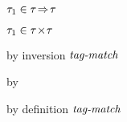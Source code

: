 {\begin{lamportproof*}
    \begin{pfproof}
      \qedstep
        \begin{pfproof}
          {$\tau_1 \in \tau\!\Rightarrow\!\tau$}
        \end{pfproof}
    \end{pfproof}

    \begin{pfproof}
      \qedstep
        \begin{pfproof}
          {$\tau_1 \in \tau\!\times\!\tau$}
        \end{pfproof}
    \end{pfproof}

    \begin{pfproof}
        \begin{pfproof}
          by inversion $\textit{tag-match}$
        \end{pfproof}
        \begin{pfproof}
          by \pfih
        \end{pfproof}
      \qedstep
      \qedstep
        \begin{pfproof}
          by definition $\textit{tag-match}$
        \end{pfproof}
    \end{pfproof}

\end{lamportproof*}}

